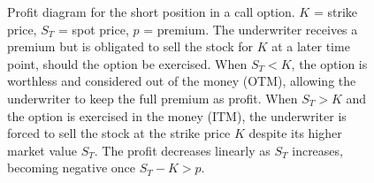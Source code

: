 \documentclass[english,12pt,a4paper,pdftex,sci,utf8]{aaltothesis}
\begin{document}
\begin{center}
\begin{figure}[H]
\centering
    \caption{Profit diagram for the short position in a call option. $K$ = strike price, $S_T$ = spot price, $p$ = premium. The underwriter receives a premium but is obligated to sell the stock for $K$ at a later time point, should the option be exercised. When $S_T < K$, the option is worthless and considered out of the money (OTM), allowing the underwriter to keep the full premium as profit. When $S_T > K$ and the option is exercised in the money (ITM), the underwriter is forced to sell the stock at the strike price $K$ despite its higher market value $S_T$. The profit decreases linearly as $S_T$ increases, becoming negative once $S_T - K > p$.}
    \label{fig:short_call_payoff}
\end{figure}
\end{center}
\end{document}

